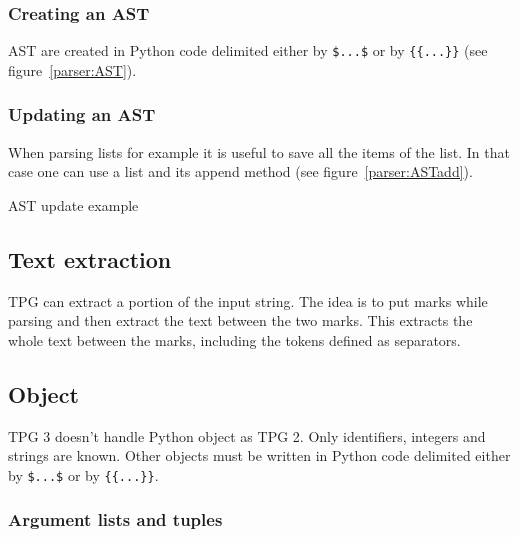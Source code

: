 \subsubsection{Creating an AST}

AST are created in Python code delimited either by \verb!$...$! or by \verb!{{...}}! (see figure~\ref{parser:AST}).

\subsubsection{Updating an AST}

When parsing lists for example it is useful to save all the items of the list.
In that case one can use a list and its append method (see figure~\ref{parser:ASTadd}).

\begin{code}
\caption{AST update example}                                    \label{parser:ASTadd}
\end{code}

\subsection{Text extraction}                                    \label{parser:mark}

TPG can extract a portion of the input string.
The idea is to put marks while parsing and then extract the text between the two marks.
This extracts the whole text between the marks, including the tokens defined as separators.

\subsection{Object}                                             \label{parser:object}

TPG 3 doesn't handle Python object as TPG 2.
Only identifiers, integers and strings are known.
Other objects must be written in Python code delimited either by \verb!$...$! or by \verb!{{...}}!.

\subsubsection{Argument lists and tuples}

